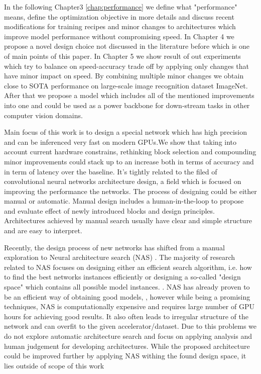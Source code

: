 In the following Chapter3 \ref{chap:performance} we define what "performance" means, define the optimization objective in more details and discuss recent modifications for training recipes and minor changes to architectures which improve model performance without compromising speed. In Chapter 4 we propose a novel design choice not discussed in the literature before which is one of main points of this paper. In Chapter 5 we show result of out experiments which try to balance on speed-accuracy trade off by applying only changes that have minor impact on speed. By combining multiple minor changes we obtain close to SOTA performance on large-scale image recognition dataset ImageNet. After that we propose a model which includes all of the mentioned improvements into one and could be used as a power backbone for down-stream tasks in other computer vision domains.

Main focus of this work is to design a special network which has high precision and can be inferenced very fast on modern GPUs.We show that taking into account current hardware constrains, rethinking block selection and compounding minor improvements could stack up to an increase both in terms of accuracy and in term of latency over the baseline. It's tightly related to the filed of convolutional neural networks architecture design, a field which is focused on improving the performance the networks. The process of designing could be either manual or automatic. Manual design includes a human-in-the-loop to propose and evaluate effect of newly introduced blocks and design principles. Architectures achieved by manual search usually have clear and simple structure and are easy to interpret. 

Recently, the design process of new networks has shifted from a manual exploration to Neural architecture search (NAS) \cite{real2019_nas1}. The majority of research related to NAS focuses on designing either an efficient search algorithm, i.e. how to find the best networks instances efficiently \cite{zoph2018_nasnet} \cite{pham2018_nas_efficient} or designing a so-called "design space" which contains all possible model instances. \cite{radosavovic2020_designing} \cite{liu2018_nas_progressive}. NAS has already proven to be an efficient way of obtaining good models, \cite{tan2019_efficientnet} \cite{lin2020neural_genet} \cite{pham2018_nas_efficient}, however while being a promising techniques, NAS is computationally expensive and requires large number of GPU hours for achieving good results. It also often leads to irregular structure of the network and can overfit to the given accelerator/dataset. Due to this problems we do not explore automatic architecture search and focus on applying analysis and human judgement for developing architectures. While the proposed architecture could be improved further by applying NAS withing the found design space, it lies outside of scope of this work




